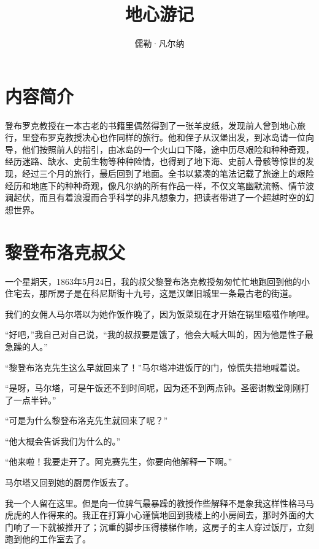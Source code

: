 \documentclass[10pt]{book}
\begin{document}
\title{地心游记}
\author{儒勒·凡尔纳}


\maketitle
\thispagestyle{empty}

\chapter*{内容简介}
登布罗克教授在一本古老的书籍里偶然得到了一张羊皮纸，发现前人曾到地心旅行，里登布罗克教授决心也作同样的旅行。他和侄子从汉堡出发，到冰岛请一位向导，他们按照前人的指引，由冰岛的一个火山口下降，途中历尽艰险和种种奇观，经历迷路、缺水、史前生物等种种险情，也得到了地下海、史前人骨骸等惊世的发现，经过三个月的旅行，最后回到了地面。全书以紧凑的笔法记载了旅途上的艰险经历和地底下的种种奇观，像凡尔纳的所有作品一样，不仅文笔幽默流畅、情节波澜起伏，而且有着浪漫而合乎科学的非凡想象力，把读者带进了一个超越时空的幻想世界。

\tableofcontents
\thispagestyle{empty}
\newpage



\setcounter{page}{1}
\chapter {黎登布洛克叔父}
一个星期天，1863年5月24日，我的叔父黎登布洛克教授匆匆忙忙地跑回到他的小住宅去，那所房子是在科尼斯街十九号，这是汉堡旧城里一条最古老的街道。

我们的女佣人马尔塔以为她作饭作晚了，因为饭菜现在才开始在锅里嗞嗞作响哩。

“好吧，”我自己对自己说，“我的叔叔要是饿了，他会大喊大叫的，因为他是性子最急躁的人。”

“黎登布洛克先生这么早就回来了！”马尔塔冲进饭厅的门，惊慌失措地喊着说。

“是呀，马尔塔，可是午饭还不到时间呢，因为还不到两点钟。圣密谢教堂刚刚打了一点半钟。”

“可是为什么黎登布洛克先生就回来了呢？”

“他大概会告诉我们为什么的。”

“他来啦！我要走开了。阿克赛先生，你要向他解释一下啊。”

马尔塔又回到她的厨房作饭去了。

我一个人留在这里。但是向一位脾气最暴躁的教授作些解释不是象我这样性格马马虎虎的人作得来的。我正在打算小心谨慎地回到我楼上的小房间去，那时外面的大门响了一下就被推开了；沉重的脚步压得楼梯作响，这房子的主人穿过饭厅，立刻跑到他的工作室去了。
\end{document}
